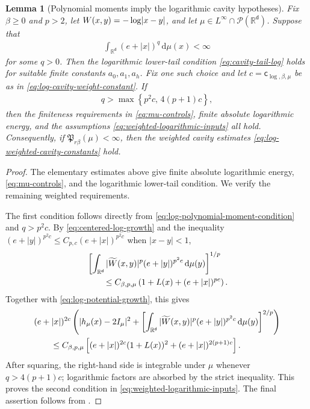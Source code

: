\documentclass[11pt,reqno]{amsart}
\numberwithin{equation}{section}
\theoremstyle{plain}
\newtheorem{lemma}[lemma]{Lemma}
\theoremstyle{remark}
\DeclarePairedDelimiter{\abs}{\lvert}{\rvert}
\renewcommand{\d}{\mathsf{d}}
\newcommand{\md}{\mathrm{d}}
\newcommand{\R}{{\mathbb{R}}}
\newcommand{\tl}{\widetilde}
\newcommand{\be}{\beta}
\newcommand{\Pp}{\mathcal{P}}
\begin{document}
\begin{lemma}[Polynomial moments imply the logarithmic cavity hypotheses]
\label{lem:log-polynomial-moment-criterion}
Fix \(\be\ge0\) and \(p>2\), let \(W(x,y)=-\log\abs{x-y}\), and let
\(\mu\in L^\infty\cap\Pp(\R^\d)\).  Suppose that
\begin{align}\label{eq:log-polynomial-moment-condition}
 \int_{\R^\d}(e+|x|)^q\,\md\mu(x)<\infty
\end{align}
for some \(q>0\).  Then the logarithmic lower-tail condition \eqref{eq:cavity-tail-log} holds for suitable finite constants \(a_0,a_1,a_h\).  Fix one such choice and let \(c=\mathsf c_{\log,\be,\mu}\) be as in \eqref{eq:log-cavity-weight-constant}.  If
\begin{align}\label{eq:log-polynomial-moment-threshold}
 q>\max\left\{p^2c,\,4(p+1)c\right\},
\end{align}
then the finiteness requirements in \eqref{eq:mu-controls}, finite absolute logarithmic energy, and the assumptions \eqref{eq:weighted-logarithmic-inputs} all hold.  Consequently, if \(\mathfrak P_{r\be}(\mu)<\infty\), then the weighted cavity estimates \eqref{eq:log-weighted-cavity-constants} hold.
\end{lemma}

\begin{proof}

The elementary estimates above give finite absolute logarithmic energy, \eqref{eq:mu-controls}, and the logarithmic lower-tail condition.  We verify the remaining weighted requirements.

The first condition follows directly from \eqref{eq:log-polynomial-moment-condition} and \(q>p^2c\).  By \eqref{eq:centered-log-growth} and the inequality \((e+|y|)^{p^2c}\le C_{p,c}(e+|x|)^{p^2c}\) when \(|x-y|<1\),
\begin{align}\label{eq:weighted-logarithmic-section-bound}
 &\left[\int_{\R^\d}|\tl W(x,y)|^p(e+|y|)^{p^2c}\,\md\mu(y)\right]^{1/p}\notag\\
 &\qquad\le C_{\be,p,\mu}
 \left(1+L(x)+(e+|x|)^{pc}\right).
\end{align}
Together with \eqref{eq:log-potential-growth}, this gives
\begin{align}\label{eq:weighted-logarithmic-input-bound}
 &(e+|x|)^{2c}
 \left(
 |h_\mu(x)-2I_\mu|^2
 +\left[\int_{\R^\d}|\tl W(x,y)|^p(e+|y|)^{p^2c}\,\md\mu(y)\right]^{2/p}
 \right)\notag\\
 &\qquad\le C_{\be,p,\mu}
 \left[(e+|x|)^{2c}(1+L(x))^2+(e+|x|)^{2(p+1)c}\right].
\end{align}
After squaring, the right-hand side is integrable under \(\mu\) whenever \(q>4(p+1)c\); logarithmic factors are absorbed by the strict inequality.  This proves the second condition in \eqref{eq:weighted-logarithmic-inputs}.  The final assertion follows from .

\end{proof}
\end{document}
